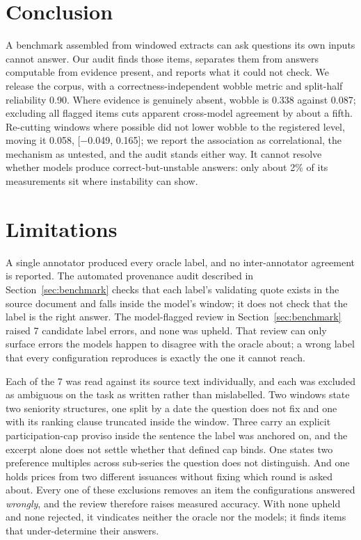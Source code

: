 \documentclass[11pt]{article}
\begin{document}
\section{Conclusion}

A benchmark assembled from windowed extracts can ask questions its own inputs cannot answer. Our
audit finds those items, separates them from answers computable from evidence present, and
reports what it could not check. We release the corpus, with a
correctness-independent wobble metric and split-half reliability 0.90. Where evidence is genuinely
absent, wobble is 0.338 against 0.087; excluding all flagged items cuts apparent cross-model
agreement by about a fifth.
Re-cutting windows where possible did not lower wobble to the registered level, moving it
0.058, [$-$0.049, 0.165]; we report the association as correlational, the mechanism as untested,
and the audit stands either way. It cannot resolve whether models produce
correct-but-unstable answers: only about 2\% of its measurements sit where instability can show.%
\label{mainend}

\section*{Limitations}

A single annotator produced every oracle label, and no inter-annotator agreement is reported. The
automated provenance audit described in Section~\ref{sec:benchmark} checks that each label's
validating quote exists in the source document and falls inside the model's window; it does not
check that the label is the right answer. The model-flagged review in
Section~\ref{sec:benchmark} raised 7 candidate label errors, and none was upheld. That review can
only surface errors the models happen to disagree with the oracle about; a wrong label that every
configuration reproduces is exactly the one it cannot reach.

Each of the 7 was read against its source text individually, and each was excluded as ambiguous on
the task as written rather than mislabelled. Two windows state two seniority structures, one split
by a date the question does not fix and one with its ranking clause truncated inside the window.
Three carry an explicit participation-cap proviso inside the sentence the label was anchored on,
and the excerpt alone does not settle whether that defined cap binds. One states two preference
multiples across sub-series the question does not distinguish. And one holds prices from two
different issuances without fixing which round is asked about. Every one of these exclusions removes an item the configurations answered \emph{wrongly}, and the
review therefore raises measured accuracy. With none upheld and none rejected, it vindicates neither the oracle nor
the models; it finds items that under-determine their answers.
\end{document}
